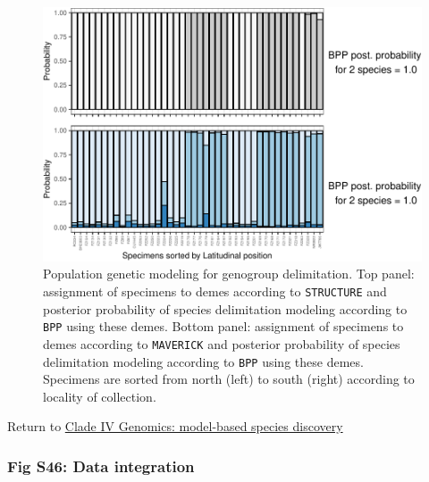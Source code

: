 \documentclass[
  11pt,
]{article}
\begin{document}
\begin{figure}
\includegraphics{Supplementary_Material_files/figure-latex/cladeIVmolecularDelimitationPopGenBpp-1} \caption{Population genetic modeling for genogroup delimitation. Top panel: assignment of specimens to demes according to \texttt{STRUCTURE} and posterior probability of species delimitation modeling according to \texttt{BPP} using these demes. Bottom panel: assignment of specimens to demes according to \texttt{MAVERICK} and posterior probability of species delimitation modeling according to \texttt{BPP} using these demes. Specimens are sorted from north (left) to south (right) according to locality of collection.}\label{fig:cladeIVmolecularDelimitationPopGenBpp}
\end{figure}

Return to \protect\hyperlink{model-based-species-discovery-7}{Clade IV Genomics: model-based species discovery}
\pagebreak

\hypertarget{fig-s46-data-integration}{%
\subsubsection{Fig S46: Data integration}\label{fig-s46-data-integration}}
\end{document}

